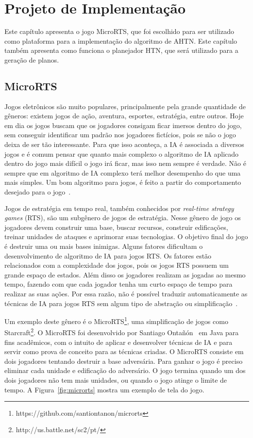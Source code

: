 
\chapter{\label{chap:proj}Projeto de Implementação}

Este capítulo apresenta o jogo MicroRTS, que foi escolhido para ser utilizado como plataforma para a implementação do algoritmo de AHTN. Este capítulo também apresenta como funciona o planejador HTN, que será utilizado para a geração de planos.

\section{MicroRTS}  \label{sec:microrts}

Jogos eletrônicos são muito populares, principalmente pela grande quantidade de gêneros: existem jogos de ação, aventura, esportes, estratégia, entre outros. Hoje em dia os jogos buscam que os jogadores consigam ficar imersos dentro do jogo, sem conseguir identificar um padrão nos jogadores fictícios, pois se não o jogo deixa de ser tão interessante.
Para que isso aconteça, a IA é associada a diversos jogos e é comum pensar que quanto mais complexo o algoritmo de IA aplicado dentro do jogo mais difícil o jogo irá ficar, mas isso nem sempre é verdade.
Não é sempre que em algoritmo de IA complexo terá melhor desempenho do que uma mais simples.
Um bom algoritmo para jogos, é feito a partir do comportamento desejado para o jogo~\cite{millington2009artificial}.

Jogos de estratégia em tempo real, também conhecidos por \textit{real-time strategy games} (RTS), são um subgênero de jogos de estratégia. 
Nesse gênero de jogo os jogadores devem construir uma base, buscar recursos, construir edificações, treinar unidades de ataques e aprimorar suas tecnologias.
O objetivo final do jogo é destruir uma ou mais bases inimigas. 
Alguns fatores dificultam o desenvolvimento de algoritmo de IA para jogos RTS. 
Os fatores estão relacionados com a complexidade dos jogos, pois os jogos RTS possuem um grande espaço de estados.
Além disso os jogadores realizam as jogadas ao mesmo tempo, fazendo com que cada jogador tenha um curto espaço de tempo para realizar as suas ações.
Por essa razão, não é possível traduzir automaticamente as técnicas de IA para jogos RTS sem algum tipo de abstração ou simplificação~\cite{ontanon2013survey, buro2012real}.

Um exemplo deste gênero é o MicroRTS\footnote{https://github.com/santiontanon/microrts}, uma simplificação de jogos como Starcraft\footnote{http://us.battle.net/sc2/pt/}. 
O MicroRTS foi desenvolvido por Santiago Ontañón~\cite{ontanon2013combinatorial} em Java para fins acadêmicos, com o intuito de aplicar e desenvolver técnicas de IA e para servir como prova de conceito para as técnicas criadas.
O MicroRTS consiste em dois jogadores tentando destruir a base adversária. 
Para ganhar o jogo é preciso eliminar cada unidade e edificação do adversário. 
O jogo termina quando um dos dois jogadores não tem mais unidades, ou quando o jogo atinge o limite de tempo. 
A Figura~\ref{fig:microrts} mostra um exemplo de tela do jogo.

